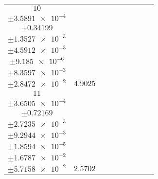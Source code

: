 \documentclass[8pt]{article}
\begin{document}
\begin{longtable}[l]{c c c c c c c c c}
$\num{10}$ & \begin{tabular}[c]{@{}c@{}}$\num{6.103e-2}$ \\ $\pm\num{3.5891e-4}$\end{tabular} & \begin{tabular}[c]{@{}c@{}}$\num{-0.18684}$ \\ $\pm\num{0.34199}$\end{tabular} & \begin{tabular}[c]{@{}c@{}}$\num{-4.2319}$ \\ $\pm\num{1.3527e-3}$\end{tabular} & \begin{tabular}[c]{@{}c@{}}$\num{2.1392e+3}$ \\ $\pm\num{4.5912e-3}$\end{tabular} & \begin{tabular}[c]{@{}c@{}}$\num{4.2795}$ \\ $\pm\num{9.185e-6}$\end{tabular} & \begin{tabular}[c]{@{}c@{}}$\num{1.1862}$ \\ $\pm\num{8.3597e-3}$\end{tabular} & \begin{tabular}[c]{@{}c@{}}$\num{4.224}$ \\ $\pm\num{2.8472e-2}$\end{tabular} & $\num{4.9025}$\\
$\num{11}$ & \begin{tabular}[c]{@{}c@{}}$\num{2.9553e-2}$ \\ $\pm\num{3.6505e-4}$\end{tabular} & \begin{tabular}[c]{@{}c@{}}$\num{3.5945e-3}$ \\ $\pm\num{0.72169}$\end{tabular} & \begin{tabular}[c]{@{}c@{}}$\num{-0.90967}$ \\ $\pm\num{2.7235e-3}$\end{tabular} & \begin{tabular}[c]{@{}c@{}}$\num{2.1425e+3}$ \\ $\pm\num{9.2944e-3}$\end{tabular} & \begin{tabular}[c]{@{}c@{}}$\num{4.2862}$ \\ $\pm\num{1.8594e-5}$\end{tabular} & \begin{tabular}[c]{@{}c@{}}$\num{1.151}$ \\ $\pm\num{1.6787e-2}$\end{tabular} & \begin{tabular}[c]{@{}c@{}}$\num{4.1736}$ \\ $\pm\num{5.7158e-2}$\end{tabular} & $\num{2.5702}$\\

\end{longtable}
\end{document}
